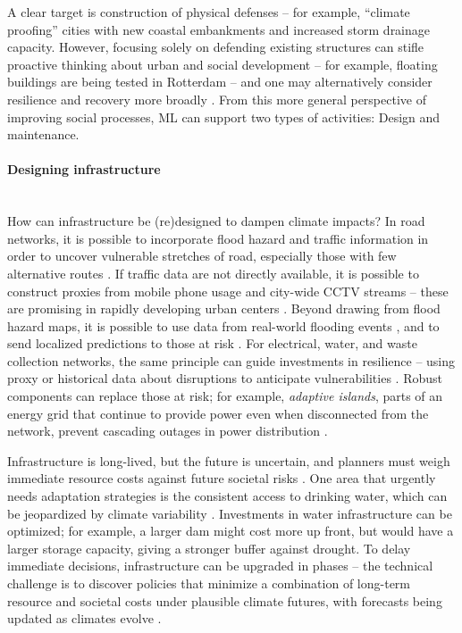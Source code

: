 \documentclass[11pt]{report}
\newcommand{\Gap}{\texorpdfstring{\hfill}{}}
\newcommand{\Longterm}{\texorpdfstring{{\small\emph{\color{OliveGreen}{\fbox{Long-term}}}}}{}}
\begin{document}
A clear target is construction of physical defenses -- for example, ``climate proofing'' cities with new coastal embankments and increased storm drainage capacity.  However, focusing solely on defending existing structures can stifle proactive thinking about urban and social development -- for example, floating buildings are being tested in Rotterdam -- and one may alternatively consider resilience and recovery more broadly \cite{pelling2010adaptation, shi2016roadmap}. From this more general perspective  of improving social processes, ML can support two types of activities: Design and maintenance.

\paragraph*{Designing infrastructure}\Gap\textbf{\Longterm}\mbox{}\\ How can infrastructure be (re)designed to dampen climate impacts?
In road networks, it is possible to incorporate flood hazard and traffic
information in order to uncover vulnerable stretches of road, especially those with few
alternative routes \cite{gupta2018infrastructure}. If traffic data are not
directly available, it is possible to construct  proxies from mobile
phone usage and city-wide CCTV streams -- these are promising in rapidly developing
urban centers \cite{frias2012estimation, jain2012road}. Beyond drawing from
flood hazard maps, it is possible to use data from real-world flooding events
\cite{pastor2014flooding}, and to send localized predictions to those at risk 
\cite{wiesel2018ml}.
For electrical, water, and waste collection networks, the same
principle can guide investments in resilience -- using proxy or historical data
about disruptions to anticipate vulnerabilities 
\cite{oshri2018infrastructure, muharemi2019machine, nateghi2018multi, panteli2015grid}. 
Robust components can replace those at risk; for example, \emph{adaptive islands}, parts of an energy grid that continue to provide power even when disconnected from the network, 
prevent cascading outages in power distribution \cite{fang2012smart}.

Infrastructure is long-lived, but the future is uncertain, and planners must weigh immediate resource costs against future societal risks \cite{fletcher2019learning}. One area that urgently needs adaptation strategies is the consistent access to drinking water, which can be jeopardized by climate variability \cite{delpla2009impacts, unihe}. Investments in water infrastructure can be optimized; for example, a larger dam might cost more up front, but would have a larger storage capacity, giving a stronger buffer against drought. To delay immediate decisions, infrastructure can be upgraded in phases -- the technical challenge is to discover policies that minimize a combination of long-term resource and societal costs under plausible climate futures, with forecasts being updated as climates evolve \cite{quinn2017direct, giuliani2015curses, shen2017trans}.
\end{document}
